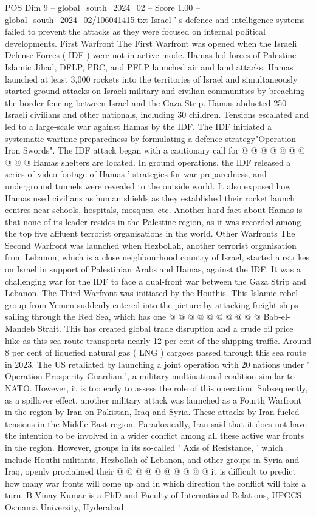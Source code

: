 \begin{textsample}{POS Dim 9 – global\_south\_2024\_02 – Score 1.00 – global\_south\_2024\_02/106041415.txt}
Israel ' s defence and intelligence systems failed to prevent the attacks as they were focused on internal political developments.
First Warfront The First Warfront was opened when the Israeli Defense Forces ( IDF ) were not in active mode.
Hamas-led forces of Palestine Islamic Jihad, DFLP, PRC, and PFLP launched air and land attacks.
Hamas launched at least 3,000 rockets into the territories of Israel and simultaneously started ground attacks on Israeli military and civilian communities by breaching the border fencing between Israel and the Gaza Strip.
Hamas abducted 250 Israeli civilians and other nationals, including 30 children.
Tensions escalated and led to a large-scale war against Hamas by the IDF.
The IDF initiated a systematic wartime preparedness by formulating a defence strategy"Operation Iron Swords".
The IDF attack began with a cautionary call for @ @ @ @ @ @ @ @ @ @ Hamas shelters are located.
In ground operations, the IDF released a series of video footage of Hamas ' strategies for war preparedness, and underground tunnels were revealed to the outside world.
It also exposed how Hamas used civilians as human shields as they established their rocket launch centres near schools, hospitals, mosques, etc.
Another hard fact about Hamas is that none of its leader resides in the Palestine region, as it was recorded among the top five affluent terrorist organisations in the world.
Other Warfronts The Second Warfront was launched when Hezbollah, another terrorist organisation from Lebanon, which is a close neighbourhood country of Israel, started airstrikes on Israel in support of Palestinian Arabs and Hamas, against the IDF.
It was a challenging war for the IDF to face a dual-front war between the Gaza Strip and Lebanon.
The Third Warfront was initiated by the Houthis.
This Islamic rebel group from Yemen suddenly entered into the picture by attacking freight ships sailing through the Red Sea, which has one @ @ @ @ @ @ @ @ @ @ Bab-el-Mandeb Strait.
This has created global trade disruption and a crude oil price hike as this sea route transports nearly 12 per cent of the shipping traffic.
Around 8 per cent of liquefied natural gas ( LNG ) cargoes passed through this sea route in 2023.
The US retaliated by launching a joint operation with 20 nations under ' Operation Prosperity Guardian ', a military multinational coalition similar to NATO.
However, it is too early to assess the role of this operation.
Subsequently, as a spillover effect, another military attack was launched as a Fourth Warfront in the region by Iran on Pakistan, Iraq and Syria.
These attacks by Iran fueled tensions in the Middle East region.
Paradoxically, Iran said that it does not have the intention to be involved in a wider conflict among all these active war fronts in the region.
However, groups in its so-called ' Axis of Resistance, ' which include Houthi militants, Hezbollah of Lebanon, and other groups in Syria and Iraq, openly proclaimed their @ @ @ @ @ @ @ @ @ @ it is difficult to predict how many war fronts will come up and in which direction the conflict will take a turn.
B Vinay Kumar is a PhD and Faculty of International Relations, UPGCS-Osmania University, Hyderabad

\end{textsample}
